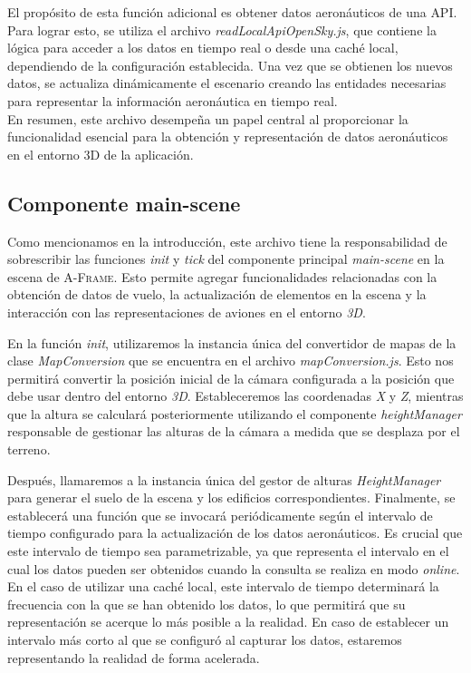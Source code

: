 \documentclass[a4paper, 11pt]{book}
\begin{document}
El propósito de esta función adicional es obtener datos aeronáuticos de una \textsc{API}. Para lograr esto, se utiliza el archivo \emph{readLocalApiOpenSky.js}, que contiene la lógica para acceder a los datos en tiempo real o desde una caché local, dependiendo de la configuración establecida. Una vez que se obtienen los nuevos datos, se actualiza dinámicamente el escenario creando las entidades necesarias para representar la información aeronáutica en tiempo real.\\
En resumen, este archivo desempeña un papel central al proporcionar la funcionalidad esencial para la obtención y representación de datos aeronáuticos en el entorno \textsc{3D} de la aplicación.

\subsection{Componente main-scene}
\label{sec:mainScene}
Como mencionamos en la introducción, este archivo tiene la responsabilidad de sobrescribir las funciones \emph{init} y \emph{tick} del componente principal \emph{main-scene} en la escena de \textsc{A-Frame}. Esto permite agregar funcionalidades relacionadas con la obtención de datos de vuelo, la actualización de elementos en la escena y la interacción con las representaciones de aviones en el entorno \emph{3D}.

En la función \emph{init}, utilizaremos la instancia única del convertidor de mapas de la clase \emph{MapConversion} que se encuentra en el archivo \emph{mapConversion.js}. Esto nos permitirá convertir la posición inicial de la cámara configurada a la posición que debe usar dentro del entorno \emph{3D}. Estableceremos las coordenadas \emph{X} y \emph{Z}, mientras que la altura se calculará posteriormente utilizando el componente \emph{heightManager} responsable de gestionar las alturas de la cámara a medida que se desplaza por el terreno.

Después, llamaremos a la instancia única del gestor de alturas \emph{HeightManager} para generar el suelo de la escena y los edificios correspondientes.
Finalmente, se establecerá una función que se invocará periódicamente según el intervalo de tiempo configurado para la actualización de los datos aeronáuticos. Es crucial que este intervalo de tiempo sea parametrizable, ya que representa el intervalo en el cual los datos pueden ser obtenidos cuando la consulta se realiza en modo \emph{online}. En el caso de utilizar una caché local, este intervalo de tiempo determinará la frecuencia con la que se han obtenido los datos, lo que permitirá que su representación se acerque lo más posible a la realidad. En caso de establecer un intervalo más corto al que se configuró al capturar los datos, estaremos representando la realidad de forma acelerada.
\end{document}
